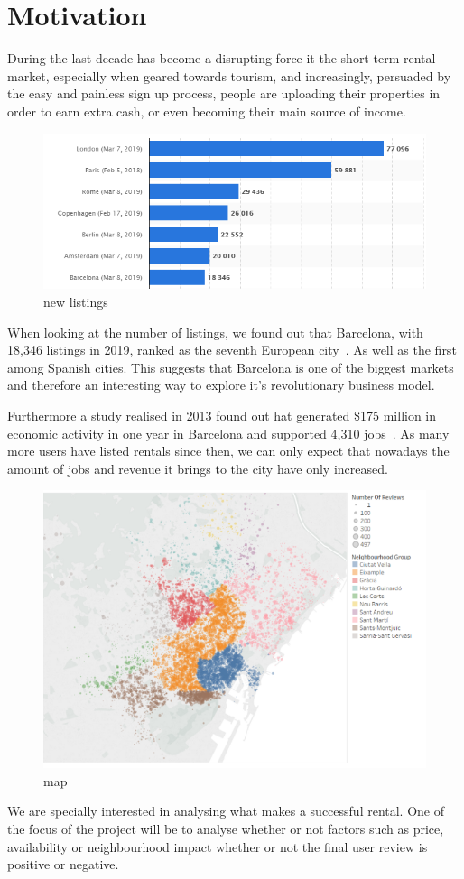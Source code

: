 

\section{Motivation}%
\label{sec:motivation}

During the last decade \airbnb has become a disrupting force it the
short-term rental market, especially when geared towards tourism, and
increasingly, persuaded by the easy and painless sign up process, people
are uploading their properties in order to earn extra cash, or even becoming
their main source of income.

\begin{figure}[H]
    \centering
    \includegraphics[width=0.6\linewidth]{images/listingplot}
    \caption{ new listings}%
    \label{fig:airbnblistingsPlot.PNG}
\end{figure}

When looking at the number of \airbnb listings, we found out that Barcelona,
with 18,346 listings in 2019, ranked as the seventh European
city~\cite{europe2019}. As well as the first among Spanish cities. This suggests
that Barcelona is one of the biggest \airbnb markets and therefore an
interesting way to explore it's revolutionary business model.

Furthermore a study realised in 2013 found out hat \airbnb generated \$175
million in economic activity in one year in Barcelona and supported 4,310
jobs~\cite{economy}. As many more users have listed rentals since then, we
can only expect that nowadays the amount of jobs and revenue it brings to
the city have only increased.

\begin{figure}[H]
    \centering
    \includegraphics[width=0.5\linewidth]{images/airbnbMap}
    \caption{\airbnb map}%
    \label{fig:airbnbMap.PNG}
\end{figure}

We are specially interested in analysing what makes a successful \airbnb rental.
One of the focus of the project will be to analyse whether or not factors
such as price, availability or neighbourhood impact whether or not the final
user review is positive or negative.
